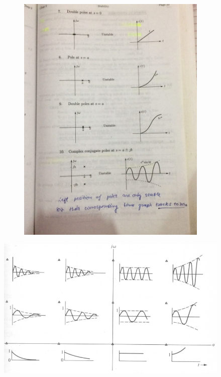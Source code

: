 \documentclass[12pt,a4paper]{article}
\begin{document}
\begin{figure}[h]
\begin{subfigure}{.5\textwidth}
			\includegraphics[width=\linewidth]{src/fig2}
			\label{fig:sub2}
		\end{subfigure}
	\end{figure}
	
	\begin{figure}[h]
		\centering
		\includegraphics[width=0.7\linewidth]{src/fig3}
		\label{fig:fig3}
	\end{figure}
	
	
\end{document}
